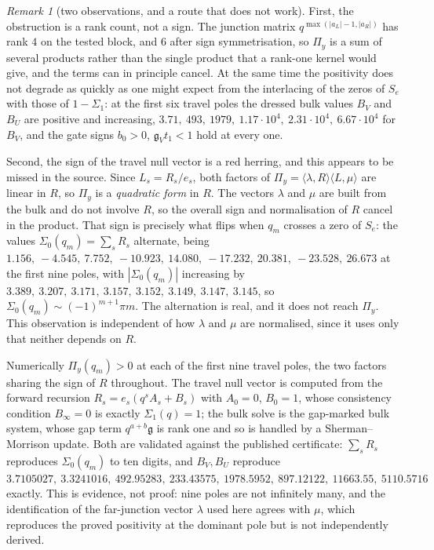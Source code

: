 \documentclass[11pt]{article}
\theoremstyle{definition}
\theoremstyle{remark}
\newtheorem{remark}[theorem]{Remark}
\theoremstyle{definition}
\begin{document}
\begin{remark}[two observations, and a route that does not work]\label{rem:rjstatus}
First, the obstruction is a rank count, not a sign. The junction matrix
$q^{\max(|a_L|-1,|a_R|)}$ has rank $4$ on the tested block, and $6$ after sign symmetrisation, so
$\Pi_y$ is a sum of several products rather than the single product that a rank-one kernel would
give, and the terms can in principle cancel. At the same time the positivity does not degrade as
quickly as one might expect from the interlacing of the zeros of $S_e$ with those of
$1-\Sigma_1$: at the first six travel poles the dressed bulk values $B_V$ and $B_U$ are positive
and increasing, $3.71,\ 493,\ 1979,\ 1.17\cdot10^4,\ 2.31\cdot10^4,\ 6.67\cdot10^4$ for $B_V$,
and the gate signs $b_0>0$, $\mathfrak g_Vt_1<1$ hold at every one.

Second, the sign of the travel null vector is a red herring, and this appears to be missed in the
source. Since $L_s=R_s/e_s$, both factors of $\Pi_y=\langle\lambda,R\rangle\langle L,\mu\rangle$
are linear in $R$, so $\Pi_y$ is a \emph{quadratic form} in $R$. The vectors $\lambda$ and $\mu$
are built from the bulk and do not involve $R$, so the overall sign and normalisation of $R$
cancel in the product. That sign is precisely what flips when $q_m$ crosses a zero of $S_e$: the
values $\Sigma_0(q_m)=\sum_sR_s$ alternate, being
$1.156,\ -4.545,\ 7.752,\ -10.923,\ 14.080,\ -17.232,\ 20.381,\ -23.528,\ 26.673$
at the first nine poles, with $|\Sigma_0(q_m)|$ increasing by $3.389,\ 3.207,\ 3.171,\ 3.157,\
3.152,\ 3.149,\ 3.147,\ 3.145$, so $\Sigma_0(q_m)\sim(-1)^{m+1}\pi m$. The alternation is real,
and it does not reach $\Pi_y$. This observation is independent of how $\lambda$ and $\mu$ are
normalised, since it uses only that neither depends on $R$.

Numerically $\Pi_y(q_m)>0$ at each of the first nine travel poles, the two factors sharing the
sign of $R$ throughout. The travel null vector is computed from the forward recursion
$R_s=e_s(q^sA_s+B_s)$ with $A_0=0$, $B_0=1$, whose consistency condition $B_\infty=0$ is exactly
$\Sigma_1(q)=1$; the bulk solve is the gap-marked bulk system, whose gap term
$q^{a+b}\mathfrak g$ is rank one and so is handled by a Sherman--Morrison update.
Both are validated against the published certificate: $\sum_sR_s$ reproduces $\Sigma_0(q_m)$ to
ten digits, and $B_V,B_U$ reproduce $3.7105027,\ 3.3241016,\ 492.95283,\ 233.43575,\
1978.5952,\ 897.12122,\ 11663.55,\ 5110.5716$ exactly. This is evidence, not proof: nine poles
are not infinitely many, and the identification of the far-junction vector $\lambda$ used here
agrees with $\mu$, which reproduces the proved positivity at the dominant pole but is not
independently derived.


\end{remark}
\end{document}
